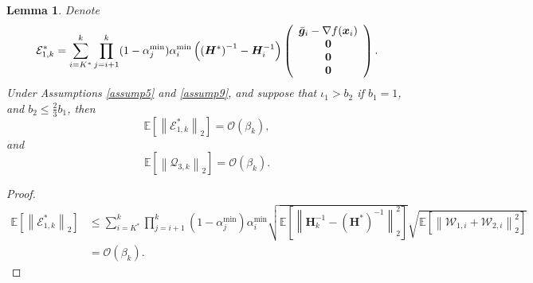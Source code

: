 \documentclass[aos]{imsart}
\numberwithin{equation}{section}
\theoremstyle{plain}
\newtheorem{lemma}{Lemma}
\begin{document}
\begin{appendix}
\begin{lemma}
\label{lemma28}
    Denote 
    \begin{equation*}
        \mathcal{E}_{1,k}^{*} = \sum_{i=K^{*}}^{k} \prod_{j=i+1}^{k} (1-\alpha^{\min}_j) \alpha^{\min}_i \left(\left(\bm{H}^{*}\right)^{-1} - \bm{H}_{i}^{-1} \right)\left( \begin{array}{c}
                \Bar{\bm{g}}_{i} - \nabla f(\bm{x}_i) \\
                \bm{0}\\
                \bm{0}\\
                \bm{0}\\
            \end{array}\right).
    \end{equation*}
    Under Assumptions \ref{assump5} and \ref{assump9}, and suppose that $\iota_1>b_2$ if $b_1=1$, and $b_2 \leq \frac{2}{3}b_1$,
    then
    \begin{equation}
        \mathbb{E} \left[ \left\|\mathcal{E}_{1,k}^{*} \right\|_2 \right] = \mathcal{O} \left( \beta_k \right),
    \end{equation}
    and
    \begin{equation}
        \mathbb{E} \left[ \left\|\mathcal{Q}_{3,k} \right\|_2 \right] = \mathcal{O} \left( \beta_k \right).
    \end{equation}
\end{lemma}

\begin{proof}
    \begin{equation*}
        \begin{split}
            \mathbb{E} \left[ \left\|\mathcal{E}_{1,k}^{*} \right\|_2 \right]  & \leq \sum_{i=K^{*}}^{k} \prod_{j=i+1}^{k} \left( 1 - \alpha^{\min}_{j} \right) \alpha^{\min}_{i} \sqrt{\mathbb{E} \left[ \left\| \bm{H}_k^{-1} - \left(\bm{H}^{*}\right)^{-1} \right\|_2^2 \right]} \sqrt{\mathbb{E} \left[ \left\| \mathcal{W}_{1,i} + \mathcal{W}_{2,i} \right\|_2^2\right]} \\
            & = \mathcal{O} \left( \beta_k \right).
        \end{split}
    \end{equation*}



\end{proof}
\end{appendix}
\end{document}
